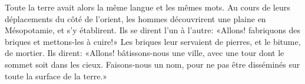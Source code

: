 Toute la terre avait alors la même langue et les mêmes mots.
Au cours de leurs déplacements du côté de l’orient,
	les hommes découvrirent une plaine en Mésopotamie, et s’y établirent.
Ils se dirent l’un à l’autre:
	«Allons! fabriquons des briques et mettons-les à cuire!»
Les briques leur servaient de pierres, et le bitume, de mortier.
Ils dirent: «Allons! bâtissons-nous une ville,
	avec une tour dont le sommet soit dans les cieux.
	Faisons-nous un nom,
	pour ne pas être disséminés sur toute la surface de la terre.»
